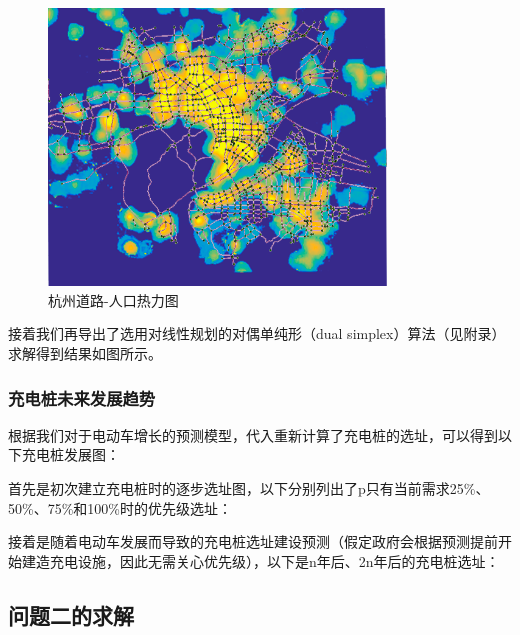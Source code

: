\documentclass[12pt, a4paper, oneside]{ctexart}
\begin{document}
\begin{figure}[h]
    \centering
    \includegraphics[width=0.8\textwidth]{pic/杭州道路-热力图.png}
    \caption{杭州道路-人口热力图}
    \label{fig:heat}
\end{figure}


接着我们再导出了选用对线性规划的对偶单纯形（dual simplex）算法（见附录）求解得到结果如图所示。

\subsubsection{充电桩未来发展趋势}
根据我们对于电动车增长的预测模型，代入重新计算了充电桩的选址，可以得到以下充电桩发展图：

首先是初次建立充电桩时的逐步选址图，以下分别列出了p只有当前需求25\%、50\%、75\%和100\%时的优先级选址：



接着是随着电动车发展而导致的充电桩选址建设预测（假定政府会根据预测提前开始建造充电设施，因此无需关心优先级），以下是n年后、2n年后的充电桩选址：


\subsection{问题二的求解}
\end{document}
